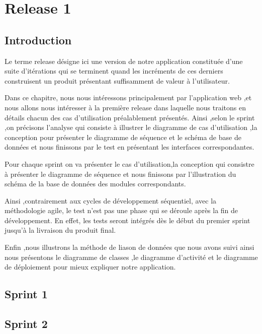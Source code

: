 \chapter{Release 1}
\section{Introduction}


Le terme release d\'{e}signe ici une version de notre application constitu\'{e}e d'une suite d'it\'{e}rations
qui se terminent quand les incr\'{e}ments de ces derniers construisent un produit pr\'{e}sentant
suffisamment de valeur \`{a} l'utilisateur.

Dans ce chapitre, nous nous intéressons principalement par l'application web ,et nous allons nous int\'{e}resser \`{a} la premi\`{e}re release dans laquelle nous traitons en d\'{e}tails chacun des cas d'utilisation pr\'{e}alablement pr\'{e}sent\'{e}s.
Ainsi ,selon le sprint ,on précisons l'analyse qui consiste  \`{a} illustrer le diagramme de cas d'utilisation ,la conception pour pr\'{e}senter
le diagramme de s\'{e}quence et le sch\'{e}ma  de base de donn\'{e}es et nous finissons par le test en pr\'{e}sentant
les interfaces correspondantes.

Pour chaque sprint on va pr\'{e}senter le cas d'utilisation,la conception
qui consistre à pr\'{e}senter le diagramme de  s\'{e}quence
et nous finissons par l'illustration du sch\'{e}ma de la base de donn\'{e}es  des modules correspondants.

Ainsi ,contrairement aux cycles de d\'{e}veloppement s\'{e}quentiel, avec la m\'{e}thodologie agile, le test n'est
pas une phase qui se d\'{e}roule apr\`{e}s la fin de d\'{e}veloppement. En effet, les tests seront int\'{e}gr\'{e}s
d\`{e}s le d\'{e}but du premier sprint jusqu'\`{a} la livraison du produit final.

Enfin ,nous illustrons  la m\'{e}thode de liason de donn\'{e}es que nous avons suivi
ainsi nous présentons le diagramme de classes ,le diagramme  d'activit\'{e} et le diagramme  de d\'{e}ploiement
pour mieux expliquer notre application.


\section{ Sprint 1 }


\section{ Sprint 2 }


